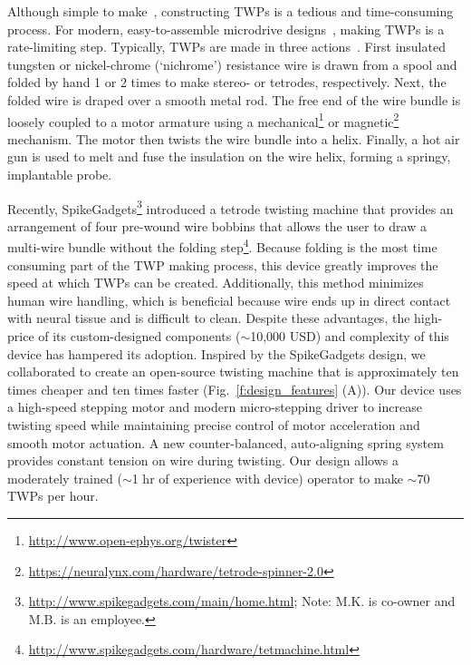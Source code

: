 \documentclass[11pt,a4paper]{article}
\begin{document}
Although simple to make~\cite{Nguyen2009}, constructing TWPs is a tedious and
time-consuming process. For modern, easy-to-assemble microdrive
designs~\cite{Voigts2013}, making TWPs is a rate-limiting step. Typically, TWPs
are made in three actions~\cite{Nguyen2009}. First insulated tungsten or
nickel-chrome (`nichrome') resistance wire is drawn from a spool and folded by
hand 1 or 2 times to make stereo- or tetrodes, respectively. Next, the folded
wire is draped over a smooth metal rod.  The free end of the wire bundle is
loosely coupled to a motor armature using a
mechanical\footnote{\url{http://www.open-ephys.org/twister}} or
magnetic\footnote{\url{https://neuralynx.com/hardware/tetrode-spinner-2.0}}
mechanism. The motor then twists the wire bundle into a helix.  Finally, a hot
air gun is used to melt and fuse the insulation on the wire helix, forming a
springy, implantable probe.

Recently,
SpikeGadgets\footnote{\url{http://www.spikegadgets.com/main/home.html}; Note:
M.K. is co-owner and M.B. is an employee.} introduced a tetrode twisting
machine that provides an arrangement of four pre-wound wire bobbins that allows
the user to draw a multi-wire bundle without the folding
step\footnote{\url{http://www.spikegadgets.com/hardware/tetmachine.html}}.
Because folding is the most time consuming part of the TWP making process,
this device greatly improves the speed at which TWPs can be created.
Additionally, this method minimizes human wire handling, which is beneficial
because wire ends up in direct contact with neural tissue and is difficult to
clean. Despite these advantages, the high-price of its custom-designed
components ($\sim$10,000 USD) and complexity of this device has hampered its
adoption. Inspired by the SpikeGadgets design, we collaborated to create an
open-source twisting machine that is approximately ten times cheaper and ten times faster
(Fig.~\ref{f:design_features} (A)). Our device uses a high-speed stepping motor
and modern micro-stepping driver to increase twisting speed while maintaining
precise control of motor acceleration and smooth motor actuation. A new
counter-balanced, auto-aligning spring system provides constant tension on
wire during twisting. Our design allows a moderately trained ($\sim$1
hr of experience with device) operator to make $\sim$70 TWPs per hour.
\end{document}
